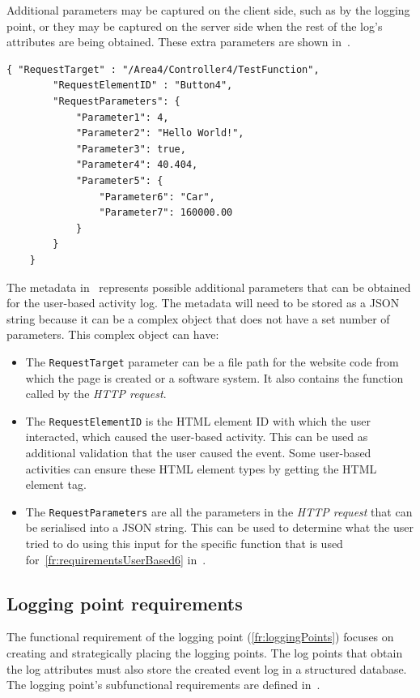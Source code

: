 \clearpage

Additional parameters may be captured on the client side, such as by the logging point, or they may be captured on the server side when the rest of the log's attributes are being obtained. These extra parameters are shown in~.

\begin{lstlisting}[style=json, caption={\textit{Metadata JSON}}, label={fig:ch2_MetadataJsonExample}] 
	{ "RequestTarget" : "/Area4/Controller4/TestFunction",
		"RequestElementID" : "Button4",
		"RequestParameters": {
			"Parameter1": 4,
			"Parameter2": "Hello World!",
			"Parameter3": true,
			"Parameter4": 40.404,
			"Parameter5": {
				"Parameter6": "Car",
				"Parameter7": 160000.00
			}
		}		
	}
\end{lstlisting}

The metadata in~ represents possible additional parameters that can be obtained for the user-based activity log. The metadata will need to be stored as a JSON string because it can be a complex object that does not have a set number of parameters. This complex object can have:

\begin{itemize}
	\item The \texttt{RequestTarget} parameter can be a file path for the website code from which the page is created or a software system. It also contains the function called by the \textit{HTTP request}.
	\item The \texttt{RequestElementID} is the HTML element ID with which the user interacted, which caused the user-based activity. This can be used as additional validation that the user caused the event. Some user-based activities can ensure these HTML element types by getting the HTML element tag.
	\item The \texttt{RequestParameters} are all the parameters in the \textit{HTTP request} that can be serialised into a JSON string. This can be used to determine what the user tried to do using this input for the specific function that is used for~\ref{fr:requirementsUserBased6} in~.
\end{itemize}

\clearpage

\subsection{Logging point requirements}\label{sec:ch2_serverFunctionalRequirements}
The functional requirement of the logging point (\ref{fr:loggingPoints}) focuses on creating and strategically placing the logging points. The log points that obtain the log attributes must also store the created event log in a structured database. The logging point's subfunctional requirements are defined in~. 

